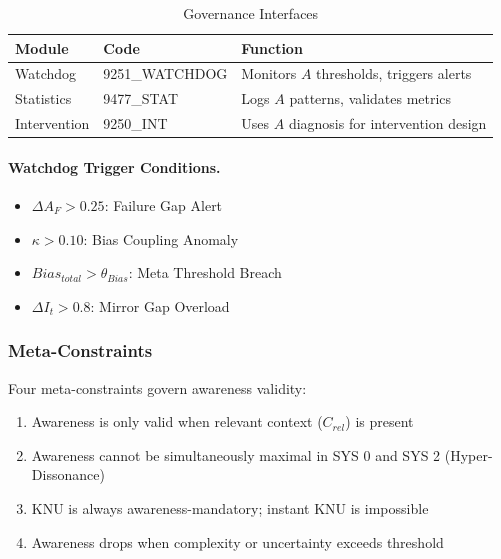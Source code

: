 \begin{table}[htbp]
\centering
\caption{Governance Interfaces}
\label{tab:governance}
\renewcommand{\arraystretch}{1.3}
\begin{tabular}{@{}lll@{}}
\toprule
\textbf{Module} & \textbf{Code} & \textbf{Function} \\
\midrule
Watchdog & 9251\_WATCHDOG & Monitors $A$ thresholds, triggers alerts \\
Statistics & 9477\_STAT & Logs $A$ patterns, validates metrics \\
Intervention & 9250\_INT & Uses $A$ diagnosis for intervention design \\
\bottomrule
\end{tabular}
\end{table}

\paragraph{Watchdog Trigger Conditions.}
\begin{itemize}
\item $\Delta A_F > 0.25$: Failure Gap Alert
\item $\kappa > 0.10$: Bias Coupling Anomaly
\item $Bias_{total} > \theta_{Bias}$: Meta Threshold Breach
\item $\Delta I_t > 0.8$: Mirror Gap Overload
\end{itemize}

\subsubsection{Meta-Constraints}

Four meta-constraints govern awareness validity:

\begin{enumerate}
\item[\textbf{C1:}] Awareness is only valid when relevant context ($C_{rel}$) is present
\item[\textbf{C2:}] Awareness cannot be simultaneously maximal in SYS 0 and SYS 2 (Hyper-Dissonance)
\item[\textbf{C3:}] KNU is always awareness-mandatory; instant KNU is impossible
\item[\textbf{C4:}] Awareness drops when complexity or uncertainty exceeds threshold
\end{enumerate}

